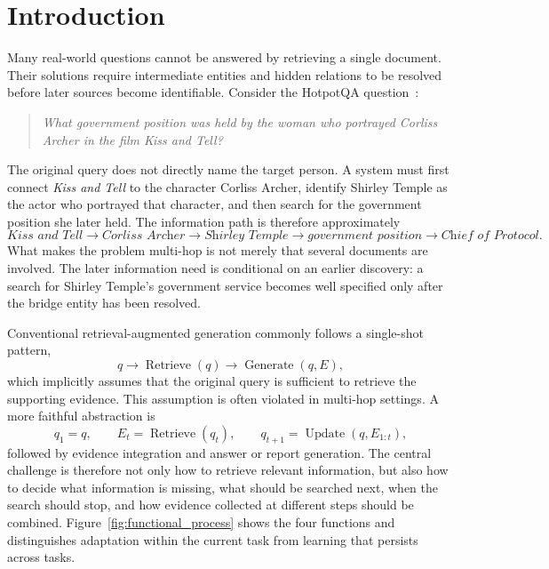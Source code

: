 \section{Introduction}
\label{sec:introduction}

Many real-world questions cannot be answered by retrieving a single document. Their solutions require intermediate entities and hidden relations to be resolved before later sources become identifiable. Consider the HotpotQA question~\cite{yang2018hotpotqa}:
\begin{quote}
\emph{What government position was held by the woman who portrayed Corliss Archer in the film \emph{Kiss and Tell}?}
\end{quote}
The original query does not directly name the target person. A system must first connect \emph{Kiss and Tell} to the character Corliss Archer, identify Shirley Temple as the actor who portrayed that character, and then search for the government position she later held. The information path is therefore approximately
\[
\textit{Kiss and Tell}
\rightarrow \textit{Corliss Archer}
\rightarrow \textit{Shirley Temple}
\rightarrow \textit{government position}
\rightarrow \textit{Chief of Protocol}.
\]
What makes the problem multi-hop is not merely that several documents are involved. The later information need is conditional on an earlier discovery: a search for Shirley Temple's government service becomes well specified only after the bridge entity has been resolved.

Conventional retrieval-augmented generation commonly follows a single-shot pattern,
\[
q \rightarrow \operatorname{Retrieve}(q) \rightarrow \operatorname{Generate}(q,E),
\]
which implicitly assumes that the original query is sufficient to retrieve the supporting evidence. This assumption is often violated in multi-hop settings. A more faithful abstraction is
\[
q_1=q, \qquad
E_t=\operatorname{Retrieve}(q_t), \qquad
q_{t+1}=\operatorname{Update}(q,E_{1:t}),
\]
followed by evidence integration and answer or report generation. The central challenge is therefore not only how to retrieve relevant information, but also how to decide what information is missing, what should be searched next, when the search should stop, and how evidence collected at different steps should be combined. Figure~\ref{fig:functional_process} shows the four functions and distinguishes adaptation within the current task from learning that persists across tasks.

